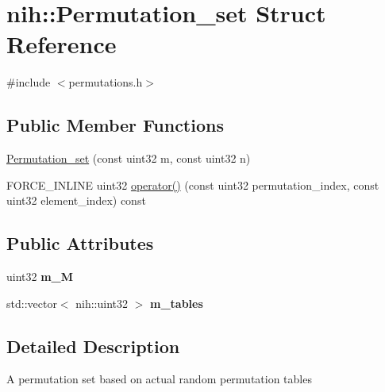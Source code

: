 \hypertarget{structnih_1_1_permutation__set}{
\section{nih\-:\-:\-Permutation\-\_\-set \-Struct \-Reference}
\label{structnih_1_1_permutation__set}
}


{\ttfamily \#include $<$permutations.\-h$>$}

\subsection*{\-Public \-Member \-Functions}
\begin{DoxyCompactItemize}
\item 
\hyperlink{structnih_1_1_permutation__set_a5d2718fb64fab202b29c4f454fb25381}{\-Permutation\-\_\-set} (const uint32 m, const uint32 n)
\item 
\-F\-O\-R\-C\-E\-\_\-\-I\-N\-L\-I\-N\-E uint32 \hyperlink{structnih_1_1_permutation__set_aa74d7e78932141a5562fca993fc55f51}{operator()} (const uint32 permutation\-\_\-index, const uint32 element\-\_\-index) const 
\end{DoxyCompactItemize}
\subsection*{\-Public \-Attributes}
\begin{DoxyCompactItemize}
\item 
\hypertarget{structnih_1_1_permutation__set_a6ed192489e39ea3f8177372b128405ab}{
uint32 {\bfseries m\-\_\-\-M}}
\label{structnih_1_1_permutation__set_a6ed192489e39ea3f8177372b128405ab}

\item 
\hypertarget{structnih_1_1_permutation__set_a2249dc39742ba503c55c237ebeb86756}{
std\-::vector$<$ nih\-::uint32 $>$ {\bfseries m\-\_\-tables}}
\label{structnih_1_1_permutation__set_a2249dc39742ba503c55c237ebeb86756}

\end{DoxyCompactItemize}


\subsection{\-Detailed \-Description}
\-A permutation set based on actual random permutation tables 

